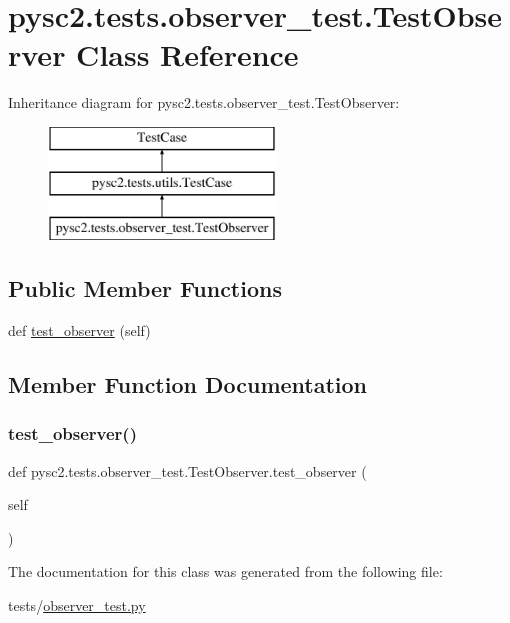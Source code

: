 \hypertarget{classpysc2_1_1tests_1_1observer__test_1_1_test_observer}{}\section{pysc2.\+tests.\+observer\+\_\+test.\+Test\+Observer Class Reference}
\label{classpysc2_1_1tests_1_1observer__test_1_1_test_observer}
Inheritance diagram for pysc2.\+tests.\+observer\+\_\+test.\+Test\+Observer\+:\begin{figure}[H]
\begin{center}
\leavevmode
\includegraphics[height=3.000000cm]{classpysc2_1_1tests_1_1observer__test_1_1_test_observer}
\end{center}
\end{figure}
\subsection*{Public Member Functions}
\begin{DoxyCompactItemize}
\item 
def \mbox{\hyperlink{classpysc2_1_1tests_1_1observer__test_1_1_test_observer_af1de11b8c98c8bbf6719fcc6b0a14b91}{test\+\_\+observer}} (self)
\end{DoxyCompactItemize}


\subsection{Member Function Documentation}
\mbox{\label{classpysc2_1_1tests_1_1observer__test_1_1_test_observer_af1de11b8c98c8bbf6719fcc6b0a14b91}} 
\subsubsection{\texorpdfstring{test\+\_\+observer()}{test\_observer()}}
{\footnotesize\ttfamily def pysc2.\+tests.\+observer\+\_\+test.\+Test\+Observer.\+test\+\_\+observer (\begin{DoxyParamCaption}\item[{}]{self }\end{DoxyParamCaption})}



The documentation for this class was generated from the following file\+:\begin{DoxyCompactItemize}
\item 
tests/\mbox{\hyperlink{observer__test_8py}{observer\+\_\+test.\+py}}\end{DoxyCompactItemize}
